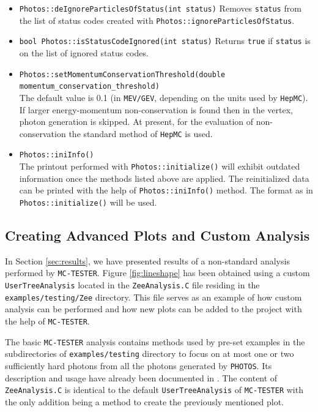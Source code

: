 \documentclass[]{Photos_interface_design}
\begin{document}
\begin{itemize}
        {\tt status} will be ignored in check of momentum conservation and will not be passed
        to algorithm generating bremsstrahlung.
  \item {\tt Photos::deIgnoreParticlesOfStatus(int status)} Removes {\tt status} from
        the list of status codes created with {\tt Photos::ignoreParticlesOfStatus}.
  \item {\tt bool Photos::isStatusCodeIgnored(int status)} Returns {\tt true} if {\tt status}
        is on the list of ignored status codes.
  \item {\tt Photos::setMomentumConservationThreshold(double momentum\_{}conservation\_{}threshold)} \\
        The default value is 0.1 (in {\tt MEV/GEV}, depending
on the units used by {\tt HepMC}). If larger energy-momentum non-conservation
        is found then in  the vertex, photon generation  is skipped. 
        At present, for the evaluation of non-conservation  the standard method of {\tt HepMC}
        is used.
  \item {\tt Photos::iniInfo()} \\
        The printout performed with  {\tt Photos::initialize()}  will exhibit 
        outdated information
        once the methods listed above are applied. The reinitialized data can be printed with 
        the help of  {\tt Photos::iniInfo()} method.
        The format as in {\tt Photos::initialize()}  will be used.		
\end{itemize}

\subsection{Creating Advanced Plots and Custom Analysis}
\label{App:Plots}

In Section \ref{sec:results}, we have presented results of a non-standard
analysis performed by {\tt MC-TESTER}. Figure \ref{fig:lineshape} has been
obtained using a custom {\tt UserTreeAnalysis} located in the {\tt ZeeAnalysis.C} file
residing in the {\tt examples/testing/Zee} directory. This file serves as an
example of how custom analysis can be performed and how new plots can be
added to the project with the help of {\tt MC-TESTER}.

The basic {\tt MC-TESTER} analysis contains methods used by pre-set examples
in the subdirectories of {\tt examples/testing} directory to focus on at most one or two 
sufficiently hard photons from all the photons generated
by {\tt PHOTOS}. Its description and usage have already been documented in \cite{Davidson:2008ma}.
The content of {\tt ZeeAnalysis.C} is identical to the default {\tt UserTreeAnalysis}
of {\tt MC-TESTER} with the only addition being a method to create
the previously mentioned plot.
\end{document}
